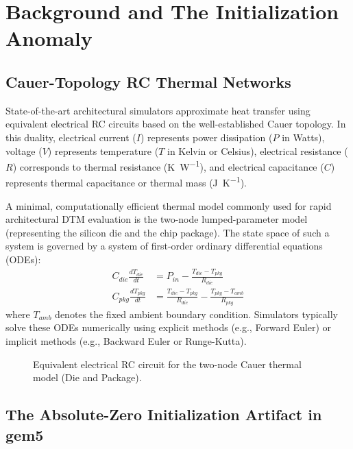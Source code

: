 \section{Background and The Initialization Anomaly}
\label{sec:background}

\subsection{Cauer-Topology RC Thermal Networks}

State-of-the-art architectural simulators approximate heat transfer using equivalent electrical RC circuits based on the well-established Cauer topology. In this duality, electrical current ($I$) represents power dissipation ($P$ in Watts), voltage ($V$) represents temperature ($T$ in Kelvin or Celsius), electrical resistance ($R$) corresponds to thermal resistance (\si{\kelvin\per\watt}), and electrical capacitance ($C$) represents thermal capacitance or thermal mass (\si{\joule\per\kelvin}).

A minimal, computationally efficient thermal model commonly used for rapid architectural DTM evaluation is the two-node lumped-parameter model (representing the silicon die and the chip package). The state space of such a system is governed by a system of first-order ordinary differential equations (ODEs):
\begin{align}
    C_{die} \frac{dT_{die}}{dt} &= P_{in} - \frac{T_{die} - T_{pkg}}{R_{die}} \label{eq:tdie} \\
    C_{pkg} \frac{dT_{pkg}}{dt} &= \frac{T_{die} - T_{pkg}}{R_{die}} - \frac{T_{pkg} - T_{amb}}{R_{pkg}} \label{eq:tpkg}
\end{align}
where $T_{amb}$ denotes the fixed ambient boundary condition. Simulators typically solve these ODEs numerically using explicit methods (e.g., Forward Euler) or implicit methods (e.g., Backward Euler or Runge-Kutta).

\begin{figure}[t]
\centering
\caption{Equivalent electrical RC circuit for the two-node Cauer thermal model (Die and Package).}
\label{fig:cauer_topology}
\end{figure}

\subsection{The Absolute-Zero Initialization Artifact in gem5}

